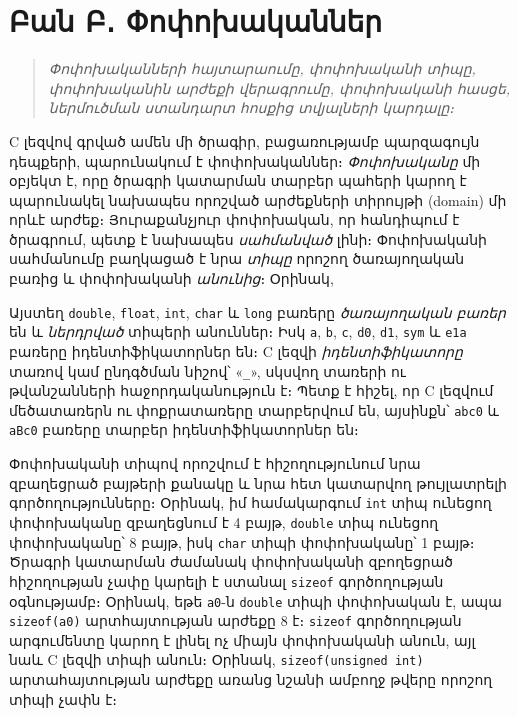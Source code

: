 \hypertarget{ux562ux561ux576-ux562-ux583ux578ux583ux578ux56dux561ux56fux561ux576ux576ux565ux580}{%
\section{Բան Բ․
Փոփոխականներ}\label{ux562ux561ux576-ux562-ux583ux578ux583ux578ux56dux561ux56fux561ux576ux576ux565ux580}}

\begin{quote}
\emph{Փոփոխականների հայտարաումը, փոփոխականի տիպը, փոփոխականին արժեքի
վերագրումը, փոփոխականի հասցե, ներմուծման ստանդարտ հոսքից տվյալների
կարդալը։}
\end{quote}

C լեզվով գրված ամեն մի ծրագիր, բացառությամբ պարզագույն դեպքերի,
պարունակում է փոփոխականներ։ \emph{Փոփոխականը} մի օբյեկտ է, որը ծրագրի
կատարման տարբեր պահերի կարող է պարունակել նախապես որոշված արժեքների
տիրույթի (domain) մի որևէ արժեք։ Յուրաքանչյուր փոփոխական, որ հանդիպում է
ծրագրում, պետք է նախապես \emph{սահմանված} լինի։ Փոփոխականի սահմանումը
բաղկացած է նրա \emph{տիպը} որոշող ծառայողական բառից և փոփոխականի
\emph{անունից}։ Օրինակ,

\begin{Shaded}
\begin{Highlighting}[]
 
\end{Highlighting}
\end{Shaded}

Այստեղ \texttt{double}, \texttt{float}, \texttt{int}, \texttt{char} և
\texttt{long} բառերը \emph{ծառայողական բառեր} են և \emph{ներդրված}
տիպերի անուններ։ Իսկ \texttt{a}, \texttt{b}, \texttt{c}, \texttt{d0},
\texttt{d1}, \texttt{sym} և \texttt{e1a} բառերը իդենտիֆիկատորներ են։ C
լեզվի \emph{իդենտիֆիկատորը} տառով կամ ընդգծման նիշով՝ «\texttt{\_}»,
սկսվող տառերի ու թվանշանների հաջորդականություն է։ Պետք է հիշել, որ C
լեզվում մեծատառերն ու փոքրատառերը տարբերվում են, այսինքն՝ \texttt{abc0}
և \texttt{aBc0} բառերը տարբեր իդենտիֆիկատորներ են։

Փոփոխականի տիպով որոշվում է հիշողությունում նրա զբաղեցրած բայթերի քանակը
և նրա հետ կատարվող թույլատրելի գործողությունները։ Օրինակ, իմ համակարգում
\texttt{int} տիպ ունեցող փոփոխականը զբաղեցնում է 4 բայթ, \texttt{double}
տիպ ունեցող փոփոխականը՝ 8 բայթ, իսկ \texttt{char} տիպի փոփոխականը՝ 1
բայթ։ Ծրագրի կատարման ժամանակ փոփոխականի զբողեցրած հիշողության չափը
կարելի է ստանալ \texttt{sizeof} գործողության օգնությամբ։ Օրինակ, եթե
\texttt{a0}-ն \texttt{double} տիպի փոփոխական է, ապա \texttt{sizeof(a0)}
արտհայտության արժեքը 8 է։ \texttt{sizeof} գործողության արգումենտը կարող
է լինել ոչ միայն փոփոխականի անուն, այլ նաև C լեզվի տիպի անուն։ Օրինակ,
\texttt{sizeof(unsigned\ int)} արտահայտության արժեքը առանց նշանի ամբողջ
թվերը որոշող տիպի չափն է։

